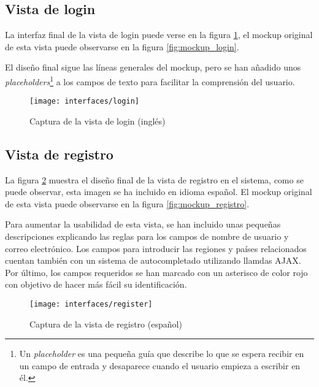 \subsection{Vista de login}
La interfaz final de la vista de login puede verse en la figura \ref{fig:interface_login},  el mockup original de esta vista puede observarse en la figura \ref{fig:mockup_login}.  

El diseño final sigue las líneas generales del mockup, pero se han añadido unos \textit{placeholders}\footnote{Un \textit{placeholder} es una pequeña guía que describe lo que se espera recibir en un campo de entrada y desaparece cuando el usuario empieza a escribir en él.} a los campos de texto para facilitar la comprensión del usuario.
\begin{figure}[h]
	\centering
	\texttt{[image: interfaces/login]}
	\caption{Captura de la vista de login (inglés)}
	\label{fig:interface_login}
\end{figure}


\subsection{Vista de registro}
La figura \ref{fig:interface_registro} muestra el diseño final de la vista de registro en el sistema,  como se puede observar, esta imagen se ha incluido en idioma español.  El mockup original de esta vista puede observarse en la figura \ref{fig:mockup_registro}.

Para aumentar la usabilidad de esta vista, se han incluido unas pequeñas descripciones explicando las reglas para los campos de nombre de usuario y correo electrónico.  Los campos para introducir las regiones y países relacionados cuentan también con un sistema de autocompletado utilizando llamdas AJAX.  Por último, los campos requeridos se han marcado con un asterisco de color rojo con objetivo de hacer más fácil su identificación.
\begin{figure}[h]
	\centering
	\texttt{[image: interfaces/register]}
	\caption{Captura de la vista de registro (español)}
	\label{fig:interface_registro}
\end{figure}


